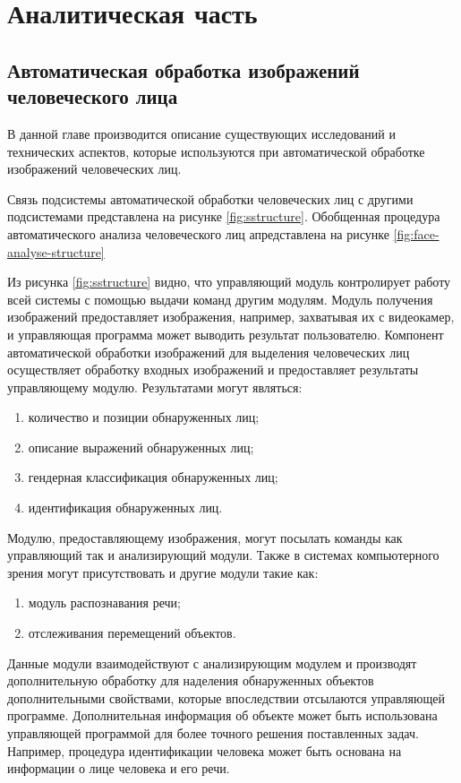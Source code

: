 \chapter{Аналитическая часть}
\label{cha:analysis}
\section{Автоматическая обработка изображений человеческого лица}

В данной главе производится описание существующих исследований и технических аспектов, которые используются при автоматической обработке изображений человеческих лиц.


Связь подсистемы автоматической обработки человеческих лиц с другими подсистемами представлена на рисунке \ref{fig:sstructure}. Обобщенная процедура автоматического анализа человеческого лиц апредставлена на рисунке \ref{fig:face-analyse-structure}



Из рисунка \ref{fig:sstructure} видно, что управляющий модуль контролирует работу всей системы с помощью выдачи команд другим модулям.
Модуль получения изображений предоставляет изображения, например,  захватывая их с видеокамер, и управляющая программа может выводить результат пользователю.
Компонент автоматической обработки изображений для выделения человеческих лиц осуществляет обработку входных изображений и предоставляет результаты управляющему модулю.
Результатами могут являться:

\begin{enumerate}
  \item количество и позиции обнаруженных лиц;
  \item описание выражений обнаруженных лиц;
  \item гендерная классификация обнаруженных лиц;
  \item идентификация обнаруженных лиц.
\end{enumerate}


Модулю, предоставляющему изображения, могут посылать команды как управляющий так и анализирующий модули. Также в системах компьютерного зрения могут присутствовать и другие модули такие как:

\begin{enumerate}
  \item модуль распознавания речи;
  \item отслеживания перемещений объектов.
\end{enumerate}

Данные модули взаимодействуют с анализирующим модулем и производят дополнительную обработку для наделения обнаруженных объектов дополнительными свойствами, которые впоследствии отсылаются управляющей программе. Дополнительная информация об объекте может быть использована управляющей программой для более точного решения поставленных задач. Например, процедура идентификации человека может быть основана на информации о лице человека и его речи.


